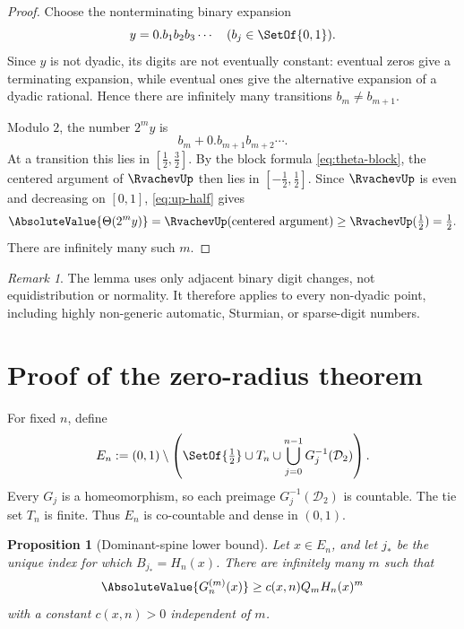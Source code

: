 \documentclass[11pt,oneside]{article}
\newtheorem{proposition}[theorem]{Proposition}
\theoremstyle{definition}
\theoremstyle{remark}
\newtheorem{remark}[theorem]{Remark}
\newcommand{\D}{\mathcal D}
\newcommand{\ThetaF}{\Theta}
\newcommand{\half}{\tfrac12}
\begin{document}
\begin{proof}
Choose the nonterminating binary expansion
\[
 y=0.b_1b_2b_3\cdots\quad(b_j\in\SetOf{0,1}).
\]
Since $y$ is not dyadic, its digits are not eventually constant: eventual zeros give
a terminating expansion, while eventual ones give the alternative expansion of a
dyadic rational.  Hence there are infinitely many transitions
$b_m\neq b_{m+1}$.

Modulo $2$, the number $2^m y$ is
\[
 b_m+0.b_{m+1}b_{m+2}\cdots.
\]
At a transition this lies in $[\half,\tfrac32]$.  By the block formula
\eqref{eq:theta-block}, the centered argument of $\RvachevUp$ then lies in
$[-\half,\half]$.  Since $\RvachevUp$ is even and decreasing on $[0,1]$,
\eqref{eq:up-half} gives
\[
 \AbsoluteValue{\ThetaF(2^m y)}
 =\RvachevUp(\text{centered argument})\geq\RvachevUp(\half)=\half.
\]
There are infinitely many such $m$.
\end{proof}

\begin{remark}
The lemma uses only adjacent binary digit changes, not equidistribution or normality.
It therefore applies to every non-dyadic point, including highly non-generic automatic,
Sturmian, or sparse-digit numbers.
\end{remark}

\section{Proof of the zero-radius theorem}
\label{sec:proof-main}

For fixed $n$, define
\begin{equation}
 E_n:=(0,1)\setminus\left(
 \SetOf{\half}\cup T_n\cup
 \bigcup_{j=0}^{n-1}G_j^{-1}(\D_2)
 \right).
 \label{eq:En}
\end{equation}
Every $G_j$ is a homeomorphism, so each preimage $G_j^{-1}(\D_2)$ is countable.
The tie set $T_n$ is finite.  Thus $E_n$ is co-countable and dense in $(0,1)$.

\begin{proposition}[Dominant-spine lower bound]
\label{prop:dominant-lower-bound}
Let $x\in E_n$, and let $j_*$ be the unique index for which
$B_{j_*}=H_n(x)$.  There are infinitely many $m$ such that
\begin{equation}
 \AbsoluteValue{G_n^{(m)}(x)}
 \geq c(x,n)Q_mH_n(x)^m
 \label{eq:dominant-lower-bound}
\end{equation}
with a constant $c(x,n)>0$ independent of $m$.
\end{proposition}
\end{document}
